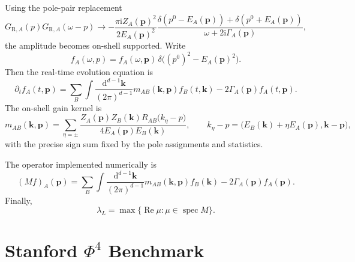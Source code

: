 \documentclass[11pt]{article}
\newcommand{\dd}{\mathrm{d}}
\newcommand{\ii}{\mathrm{i}}
\newcommand{\R}{\mathrm{R}}
\begin{document}
Using the pole-pair replacement
\begin{equation}
  G_{\R,A}(p)G_{\R,A}(\omega-p)
  \longrightarrow
  -
  \frac{\pi\ii Z_A(\mathbf p)^2}{2E_A(\mathbf p)^2}
  \frac{
    \delta(p^0-E_A(\mathbf p))+\delta(p^0+E_A(\mathbf p))
  }{\omega+2\ii\Gamma_A(\mathbf p)},
  \label{eq:pole-pair}
\end{equation}
the amplitude becomes on-shell supported. Write
\begin{equation}
  f_A(\omega,p)
  =
  f_A(\omega,\mathbf p)\,
  \delta\bigl((p^0)^2-E_A(\mathbf p)^2\bigr).
\end{equation}
Then the real-time evolution equation is
\begin{equation}
  \partial_t f_A(t,\mathbf p)
  =
  \sum_B\int
  \frac{\dd^{d-1}\mathbf k}{(2\pi)^{d-1}}
  m_{AB}(\mathbf k,\mathbf p) f_B(t,\mathbf k)
  -
  2\Gamma_A(\mathbf p)f_A(t,\mathbf p).
  \label{eq:general-evolution}
\end{equation}
The on-shell gain kernel is
\begin{equation}
  m_{AB}(\mathbf k,\mathbf p)
  =
  \sum_{\eta=\pm}
  \frac{
    Z_A(\mathbf p)Z_B(\mathbf k)
    R_{AB}\bigl(k_\eta-p\bigr)
  }
  {4E_A(\mathbf p)E_B(\mathbf k)},
  \qquad
  k_\eta-p
  =
  \bigl(E_B(\mathbf k)+\eta E_A(\mathbf p),\mathbf k-\mathbf p\bigr),
  \label{eq:gain-kernel}
\end{equation}
with the precise sign sum fixed by the pole assignments and statistics.

The operator implemented numerically is
\begin{equation}
  (Mf)_A(\mathbf p)
  =
  \sum_B\int
  \frac{\dd^{d-1}\mathbf k}{(2\pi)^{d-1}}
  m_{AB}(\mathbf k,\mathbf p) f_B(\mathbf k)
  -
  2\Gamma_A(\mathbf p)f_A(\mathbf p).
  \label{eq:M-general}
\end{equation}
Finally,
\begin{equation}
  \lambda_L = \max\{\operatorname{Re}\mu:\mu\in\operatorname{spec}M\}.
  \label{eq:lambda-general}
\end{equation}

\section{Stanford \texorpdfstring{\(\Phi^4\)}{Phi4} Benchmark}
\label{sec:stanford}
\end{document}
